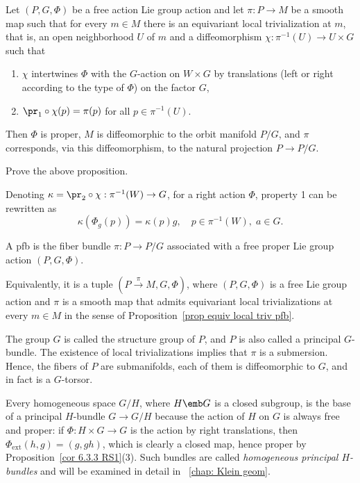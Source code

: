 \begin{prop}\label{prop equiv local triv pfb}
    Let $(P,G,\Phi)$  be a free action Lie group action and let $\pi:P\to M$ be a smooth map such that for every $m\in M$ there is an equivariant local trivialization at $m$, that is, an open neighborhood $U$ of $m$ and a diffeomorphism $\chi:\pi^{-1}(U)\to U\times G$ such that
    \begin{enumerate}
        \item $\chi$ intertwines $\Phi$ with the $G$-action on $W\times G$ by translations (left or right according to the type of $\Phi$) on the factor $G$,
        \item $\pr_1\circ \chi(p)=\pi(p)$ for all $p\in\pi^{-1}(U)$.
    \end{enumerate}
    Then $\Phi$ is proper, $M$ is diffeomorphic to the orbit manifold $P\slash G$, and $\pi$ corresponds, via this diffeomorphism, to the natural projection $P\to P\slash G$.
\end{prop}

\begin{xca}
    Prove the above proposition.
\end{xca}

Denoting $\kappa=\pr_2\circ\chi :\pi^{-1}(W)\to G$, for a right action $\Phi$, property 1 can be rewritten as 
\[\kappa\left(\Phi_g(p)\right)=\kappa(p)g,\quad p\in\pi^{-1}(W),\; a\in G.\]


\begin{defn}\label{def pfb}
    A \gls{pfb} is the fiber bundle $\pi:P\to P\slash G$ associated with a free proper Lie group action $(P,G,\Phi)$. 
    
    Equivalently, it is a tuple $(P\overset{\pi}{\to}M,G,\Phi)$, where $(P,G,\Phi)$ is a free Lie group action and $\pi$ is a smooth map that admits equivariant local trivializations at every $m\in M$ in the sense of Proposition~\ref{prop equiv local triv pfb}.

    The group $G$ is called the structure group of $P$, and $P$ is also called a principal $G$-bundle. The existence of local trivializations implies that $\pi$ is a submersion. Hence, the fibers of $P$ are submanifolds, each of them is diffeomorphic to $G$, and in fact is a $G$-torsor.
\end{defn}


\begin{example}\label{ex homogeneous principal bundles}
    Every homogeneous space $G\slash H$, where $H\emb G$ is a closed subgroup, is the base of a principal $H$-bundle  $G\to G\slash H$ because the action of $H$ on $G$ is always free and proper: if $\Phi:H\times G\to G$ is the action by right translations, then $\Phi_{\mathrm{ext}}(h,g)=(g,gh)$, which is clearly a closed map, hence proper by Proposition~\ref{cor 6.3.3 RS1}(3). Such bundles are called \emph{homogeneous principal $H$-bundles} and will be examined in detail in \Chap~\ref{chap: Klein geom}.
\end{example}


